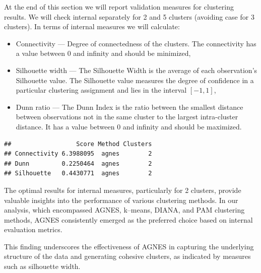 \documentclass[11pt,a4paper]{article}\usepackage[]{graphicx}\usepackage[]{xcolor}
\makeatletter
\newenvironment{kframe}{%
 \def\at@end@of@kframe{}%
 \ifinner\ifhmode%
  \def\at@end@of@kframe{\end{minipage}}%
  \begin{minipage}{\columnwidth}%
 \fi\fi%
 \def\FrameCommand##1{\hskip\@totalleftmargin \hskip-\fboxsep
 \colorbox{shadecolor}{##1}\hskip-\fboxsep
     \hskip-\linewidth \hskip-\@totalleftmargin \hskip\columnwidth}%
 \MakeFramed {\advance\hsize-\width
   \@totalleftmargin\z@ \linewidth\hsize
   \@setminipage}}%
 {\par\unskip\endMakeFramed%
 \at@end@of@kframe}
\newenvironment{knitrout}{}{} %
\makeatother
\begin{document}
	At the end of this section we will report validation measures for clustering results. We will check internal separately for 2 and 5 clusters (avoiding case for 3 clusters). In terms of internal measures we will calculate:
	\begin{itemize}
		\item Connectivity --- Degree of connectedness of the clusters. The connectivity has a value between 0 and infinity and should be minimized,
		\item Silhouette width --- The Silhouette Width is the average of each observation's Silhouette value. The Silhouette value measures the degree of confidence in a particular clustering assignment and lies in the interval $[-1,1]$,
		\item Dunn ratio --- The Dunn Index is the ratio between the smallest distance between observations not in the same cluster to the largest intra-cluster distance. It has a value between 0 and infinity and should be maximized.
	\end{itemize}
	
\begin{knitrout}
\color{fgcolor}\begin{kframe}
\begin{verbatim}
##                  Score Method Clusters
## Connectivity 6.3988095  agnes        2
## Dunn         0.2250464  agnes        2
## Silhouette   0.4430771  agnes        2
\end{verbatim}
\end{kframe}
\end{knitrout}
	
	
	The optimal results for internal measures, particularly for 2 clusters, provide valuable insights into the performance of various clustering methods. In our analysis, which encompassed AGNES, k--means, DIANA, and PAM clustering methods, AGNES consistently emerged as the preferred choice based on internal evaluation metrics.

This finding underscores the effectiveness of AGNES in capturing the underlying structure of the data and generating cohesive clusters, as indicated by measures such as silhouette width.
\end{document}

